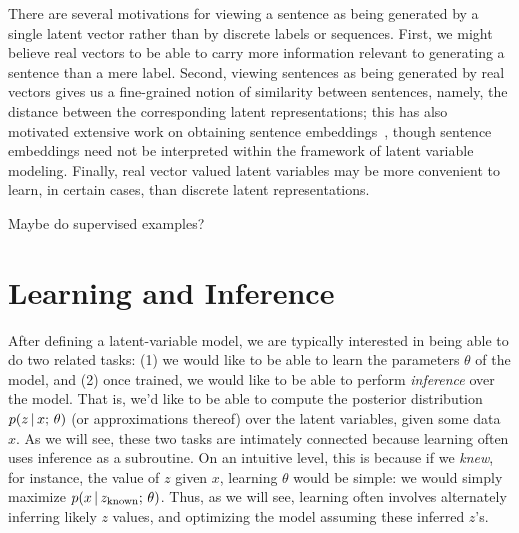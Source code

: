 \documentclass{article}
\begin{document}
There are several motivations for viewing a sentence as being generated by a single latent vector rather than by discrete labels or sequences. First, we might believe real vectors to be able to carry more information relevant to generating a sentence than a mere label. Second, viewing sentences as being generated by real vectors gives us a fine-grained notion of similarity between sentences, namely, the distance between the corresponding latent representations; this has also motivated extensive work on obtaining sentence embeddings~\citep{le2014distributed,kiros2015skip,joulin2016bag,conneau2017supervised,peters2018deep,pagliardini2018unsupervised,ruckle2018concatenated,cer2018universal}, though sentence embeddings need not be interpreted within the framework of latent variable modeling. Finally, real vector valued latent variables may be more convenient to learn, in certain cases, than discrete latent representations.

Maybe do supervised examples?



\section{Learning and Inference}\label{learningin}
After defining a latent-variable model, we are typically interested in being able to do two related tasks: (1) we would like to be able to learn the parameters $\theta$ of the model, and (2) once trained, we would like to be able to perform \textit{inference} over the model. That is, we'd like to be able to compute the posterior distribution $p(z \,|\, x ; \, \theta)$ (or approximations thereof) over the latent variables, given some data $x$. As we will see, these two tasks are intimately connected because learning often uses inference as a subroutine. On an intuitive level, this is because if we \textit{knew}, for instance, the value of $z$ given $x$, learning $\theta$ would be simple: we would simply maximize $p(x \,|\, z_{\text{known}} ; \, \theta)$. Thus, as we will see, learning often involves alternately inferring likely $z$ values, and optimizing the model assuming these inferred $z$'s.


\end{document}
